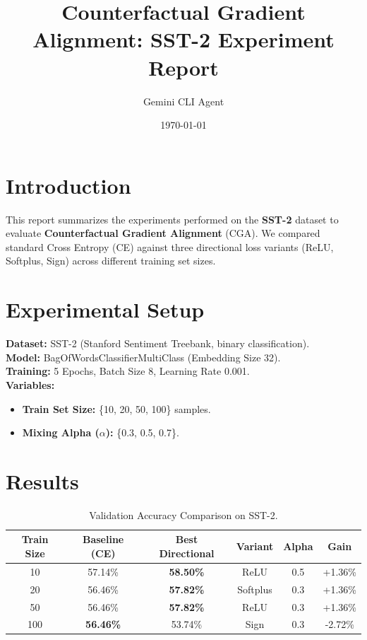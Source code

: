 \documentclass{article}
\title{Counterfactual Gradient Alignment: SST-2 Experiment Report}
\author{Gemini CLI Agent}
\date{\today}
\begin{document}
\maketitle

\section{Introduction}
This report summarizes the experiments performed on the \textbf{SST-2} dataset to evaluate \textbf{Counterfactual Gradient Alignment} (CGA). We compared standard Cross Entropy (CE) against three directional loss variants (ReLU, Softplus, Sign) across different training set sizes.

\section{Experimental Setup}
\textbf{Dataset:} SST-2 (Stanford Sentiment Treebank, binary classification). \\
\textbf{Model:} BagOfWordsClassifierMultiClass (Embedding Size 32). \\
\textbf{Training:} 5 Epochs, Batch Size 8, Learning Rate 0.001. \\
\textbf{Variables:}
\begin{itemize}
    \item \textbf{Train Set Size:} \{10, 20, 50, 100\} samples.
    \item \textbf{Mixing Alpha (\(\alpha\)):} \{0.3, 0.5, 0.7\}.
\end{itemize}

\section{Results}

\begin{table}[h]
\centering
\begin{tabular}{@{}cccccc@{}}
\toprule
\textbf{Train Size} & \textbf{Baseline (CE)} & \textbf{Best Directional} & \textbf{Variant} & \textbf{Alpha} & \textbf{Gain} \\
\midrule
10 & 57.14\% & \textbf{58.50\%} & ReLU & 0.5 & +1.36\% \\
20 & 56.46\% & \textbf{57.82\%} & Softplus & 0.3 & +1.36\% \\
50 & 56.46\% & \textbf{57.82\%} & ReLU & 0.3 & +1.36\% \\
100 & \textbf{56.46\%} & 53.74\% & Sign & 0.3 & -2.72\% \\
\bottomrule
\end{tabular}
\caption{Validation Accuracy Comparison on SST-2.}
\label{tab:results}
\end{table}
\end{document}
